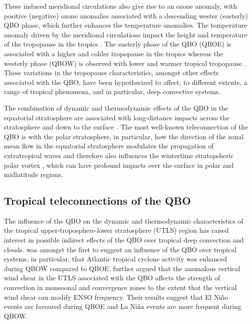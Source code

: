 These induced meridional circulations also give rise to an ozone anomaly, with positive (negative) ozone anomalies associated with a descending wester (easterly) QBO phase, which further enhances the temperature anomalies.
The temperature anomaly driven by the meridional circulations impact the height and temperature of the tropopause in the tropics \citep{baldwin2001,tegtmeier2020,tegtmeier2020b}. 
The easterly phase of the QBO (QBOE) is associated with a higher and colder tropopause in the tropics whereas the westerly phase (QBOW) is observed with lower and warmer tropical tropopause \citep{tegtmeier2020}. These variations in the tropopause characteristics, amongst other effects associated with the QBO, have been hypothesized to affect, to different extents, a range of tropical phenomena, and in particular, deep convective systems. %

The combination of dynamic and thermodynamic effects of the QBO in the equatorial stratosphere are associated with long-distance impacts across the stratosphere \citep{holton1980,lu2020} and down to the surface \citep{garfinkel2010,gray2018}. The most well-known teleconnection of the QBO is with the polar stratosphere, in particular, how the direction of the zonal mean flow in the equatorial stratosphere modulates the propagation of extratropical waves and therefore also influences the wintertime stratopsheric polar vortex \citep{lu2020}, which can have profound impacts over the surface in polar and midlatitude regions.



\subsection{Tropical teleconnections of the QBO}\label{sq:trop_qbo}



 The influence of the QBO on the dynamic and thermodynamic characteristics of the tropical upper-troposphere-lower stratosphere  (UTLS) region has raised interest in possible indirect effects of the QBO over tropical deep convection and clouds.
\cite{gray1984} was amongst the first to suggest an influence of the QBO over tropical systems, in particular, that Atlantic tropical cyclone activity was enhanced during QBOW compared to QBOE. 
\cite{gray1992} further argued that the anomalous vertical wind shear in the UTLS associated with the QBO affects the strength of convection in monsoonal and convergence zones to the extent that the vertical wind shear can modify ENSO frequency. Their results suggest that El Niño events are favoured during QBOE and  La Niña events are more frequent during QBOW.


